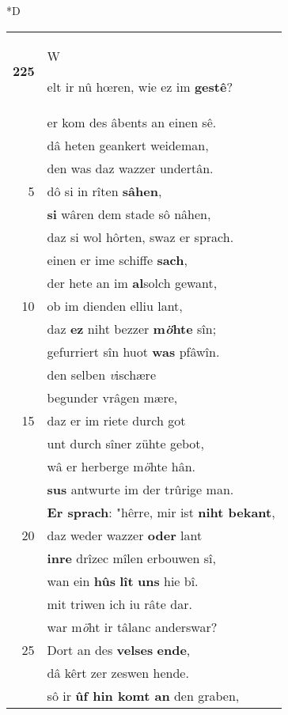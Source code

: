 \documentclass[8pt,a4paper,notitlepage]{article}
\begin{document}
\begin{table}[ht]
\begin{minipage}[t]{0.5\linewidth}
\small
\begin{center}*D
\end{center}
\begin{tabular}{rl}
\textbf{225} & \begin{large}W\end{large}elt ir nû hœren, wie ez im \textbf{gestê}?\\ 
 & er kom des âbents an einen sê.\\ 
 & dâ heten geankert weideman,\\ 
 & den was daz wazzer undertân.\\ 
5 & dô si in rîten \textbf{sâhen},\\ 
 & \textbf{si} wâren dem stade sô nâhen,\\ 
 & daz si wol hôrten, swaz er sprach.\\ 
 & einen er ime schiffe \textbf{sach},\\ 
 & der hete an im \textbf{al}solch gewant,\\ 
10 & ob im dienden elliu lant,\\ 
 & daz \textbf{ez} niht bezzer \textbf{m\textit{ö}hte} sîn;\\ 
 & gefurriert sîn huot \textbf{was} pfâwîn.\\ 
 & den selben \textit{v}ischære\\ 
 & begunder vrâgen mære,\\ 
15 & daz er im riete durch got\\ 
 & unt durch sîner zühte gebot,\\ 
 & wâ er herberge m\textit{ö}hte hân.\\ 
 & \textbf{sus} antwurte im der trûrige man.\\ 
 & \textbf{Er sprach}: "hêrre, mir ist \textbf{niht bekant},\\ 
20 & daz weder wazzer \textbf{oder} lant\\ 
 & \textbf{inre} drîzec mîlen erbouwen sî,\\ 
 & wan ein \textbf{hûs} \textbf{lît} \textbf{uns} hie bî.\\ 
 & mit triwen ich iu râte dar.\\ 
 & war m\textit{ö}ht ir tâlanc anderswar?\\ 
25 & Dort an des \textbf{velses} \textbf{ende},\\ 
 & dâ kêrt zer zeswen hende.\\ 
 & sô ir \textbf{ûf hin komt an} den graben,\\ 

\end{tabular}
\end{minipage}
\end{table}
\end{document}
